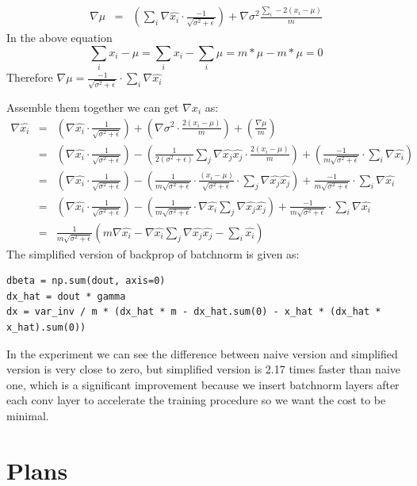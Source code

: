 \documentclass{article} %
\begin{document}
\begin{eqnarray*}
\nabla \mu &=& \left(\sum_i \nabla \hat{x_i} \cdot \frac{-1}{\sqrt{\sigma^2+\epsilon}}\right) + \nabla{\sigma^2} \frac{\sum_i -2(x_i-\mu)}{m}
\end{eqnarray*}
In the above equation
$$\sum_i x_i - \mu = \sum_i x_i - \sum_i \mu =m*\mu - m * \mu=0$$
Therefore $\nabla \mu = \frac{-1}{\sqrt{\sigma^2+\epsilon}} \cdot \sum_i \nabla \hat{x_i}$

Assemble them together we can get $\nabla x_i$ as:
\begin{eqnarray*}
	\nabla \hat{x_i} &=& \left(\nabla \hat{x_i} \cdot \frac{1}{\sqrt{\sigma^2 + \epsilon}}\right) + \left(\nabla \sigma^2 \cdot \frac{2(x_i-\mu)}{m}\right) + \left(\frac{\nabla{\mu}}{m}\right)\\
	&=& \left(\nabla \hat{x_i} \cdot \frac{1}{\sqrt{\sigma^2 + \epsilon}}\right) - \left(\frac{1}{2(\sigma^2+\epsilon)} \sum_j \nabla \hat{x_j} \hat{x_j} \cdot \frac{2(x_i-\mu)}{m}\right) + \left(\frac{-1}{m\sqrt{\sigma^2+\epsilon}} \cdot \sum_i \nabla \hat{x_i}\right)\\
	&=& \left(\nabla \hat{x_i} \cdot \frac{1}{\sqrt{\sigma^2 + \epsilon}}\right) - \left(\frac{1}{m\sqrt{\sigma^2 + \epsilon}} \cdot \frac{(x_i-\mu)}{\sqrt{\sigma^2+\epsilon}}\cdot \sum_j \nabla \hat{x_j} \hat{x_j}\right) + \frac{-1}{m\sqrt{\sigma^2+\epsilon}} \cdot \sum_i \nabla \hat{x_i}\\
	&=& \left(\nabla \hat{x_i} \cdot \frac{1}{\sqrt{\sigma^2 + \epsilon}}\right) - \left(\frac{1}{m\sqrt{\sigma^2 + \epsilon}} \cdot \nabla \hat{x_i} \sum_j \nabla \hat{x_j} \hat{x_j}\right) + \frac{-1}{m\sqrt{\sigma^2+\epsilon}} \cdot \sum_i \nabla \hat{x_i}\\
	&=& \frac{1}{m\sqrt{\sigma^2+\epsilon}}\left(m\nabla \hat{x_i} - \nabla \hat{x_i} \sum_j \nabla \hat{x_j} \hat{x_j} - \sum_i \hat{x_i}\right)
\end{eqnarray*}
The simplified version of backprop of batchnorm is given as:
\begin{lstlisting}
dbeta = np.sum(dout, axis=0)
dx_hat = dout * gamma
dx = var_inv / m * (dx_hat * m - dx_hat.sum(0) - x_hat * (dx_hat * x_hat).sum(0))
\end{lstlisting}

In the experiment we can see the difference between naive version and simplified version is very close to zero, but simplified version is 2.17 times faster than naive one, which is a significant improvement because we insert batchnorm layers after each conv layer to accelerate the training procedure so we want the cost to be minimal.


\section{Plans}
\end{document}
